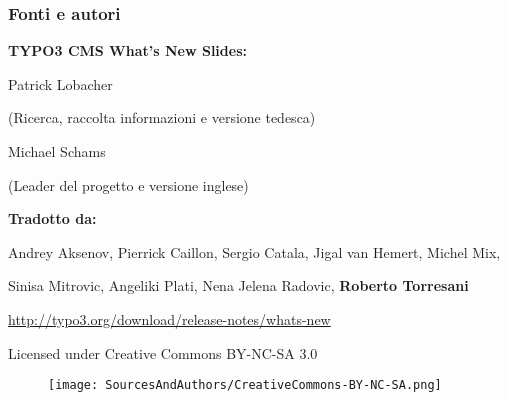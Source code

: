 \begin{frame}[fragile]
	\frametitle{Fonti e autori}

	\vspace{-0.6cm}

	\centerline{\textbf{TYPO3 CMS What's New Slides:}}

	\begin{center}
		\smaller
			\centerline{Patrick Lobacher}
			\centerline{(Ricerca, raccolta informazioni e versione tedesca)}
			\vspace{0.1cm}
			\centerline{Michael Schams}
			\centerline{(Leader del progetto e versione inglese)}
		\normalsize
	\end{center}
	\vspace{-0.6cm}
	\begin{center}
		\smaller
			\centerline{\textbf{Tradotto da:}}
			\centerline{Andrey Aksenov, Pierrick Caillon, Sergio Catala, Jigal van Hemert, Michel Mix,}
			\centerline{Sinisa Mitrovic, Angeliki Plati, Nena Jelena Radovic, \textbf{Roberto Torresani}}
		\normalsize
	\end{center}
	\vspace{-0.6cm}
	\smaller\begin{center}\url{http://typo3.org/download/release-notes/whats-new}\end{center}\normalsize

	\smaller\begin{center}Licensed under Creative Commons BY-NC-SA 3.0\end{center}\normalsize
	\begin{figure}\vspace*{-0.3cm}
		\texttt{[image: SourcesAndAuthors/CreativeCommons-BY-NC-SA.png]}
	\end{figure}

\end{frame}

